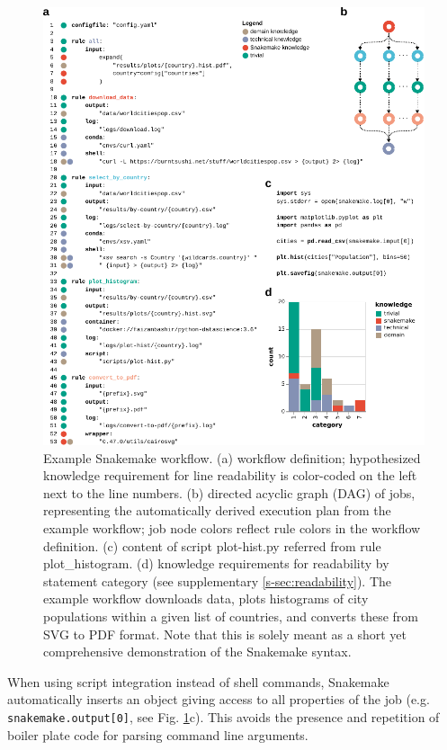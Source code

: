 \documentclass[10pt,a4paper,twocolumn]{article}
\begin{document}
\begin{figure}
    \centering
	\includegraphics[width=12cm]{example-workflow.pdf}
	\caption{
		Example Snakemake workflow. (a) workflow definition; hypothesized knowledge requirement for line readability is color-coded on the left next to the line numbers. (b) directed acyclic graph (DAG) of jobs, representing the automatically derived execution plan from the example workflow; job node colors reflect rule colors in the workflow definition. (c) content of script plot-hist.py referred from rule plot\_histogram. (d) knowledge requirements for readability by statement category (see supplementary \autoref{s-sec:readability}).
		The example workflow downloads data, plots histograms of city populations within a given list of countries, and converts these from SVG to PDF format.
		Note that this is solely meant as a short yet comprehensive demonstration of the Snakemake syntax.
	}
	\label{fig:example}
\end{figure}

When using script integration instead of shell commands, Snakemake automatically inserts an object giving access to all properties of the job (e.g. \lstinline!snakemake.output[0]!, see Fig.
\ref{fig:example}c).
This avoids the presence and repetition of boiler plate code for parsing command line arguments.
\end{document}
